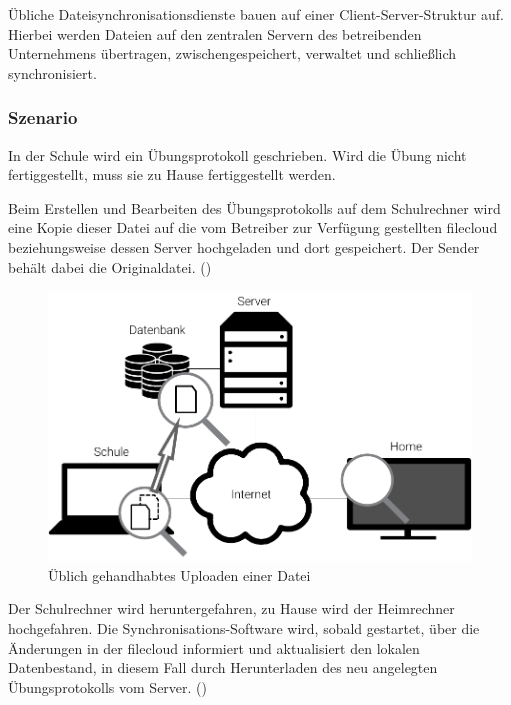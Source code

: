 Übliche Dateisynchronisationsdienste bauen auf einer Client-Server-Struktur auf.
Hierbei werden Dateien auf den zentralen Servern des betreibenden
Unternehmens übertragen, zwischengespeichert, verwaltet und schließlich
synchronisiert.

\subsubsection{Szenario}
In der Schule wird ein Übungsprotokoll geschrieben. Wird die Übung nicht
fertiggestellt, muss sie zu Hause fertiggestellt werden.

Beim Erstellen und Bearbeiten des Übungsprotokolls auf dem Schulrechner
wird eine Kopie dieser Datei auf die vom Betreiber zur Verfügung gestellten
\gls{filecloud} beziehungsweise dessen Server hochgeladen und dort gespeichert.
Der Sender behält dabei die Originaldatei. ()
\begin{figure}[htb]
	\centering
  \includegraphics[]{images/dropbox_upload}
  \caption{Üblich gehandhabtes Uploaden einer Datei}
	\label{dropbox_upload}
\end{figure}

Der Schulrechner wird heruntergefahren, zu Hause wird der Heimrechner hochgefahren. Die Synchronisations-Software wird,
sobald gestartet, über die Änderungen in der \gls{filecloud} informiert und aktualisiert den lokalen Datenbestand, in
diesem Fall durch Herunterladen des neu angelegten Übungsprotokolls vom Server. ()

